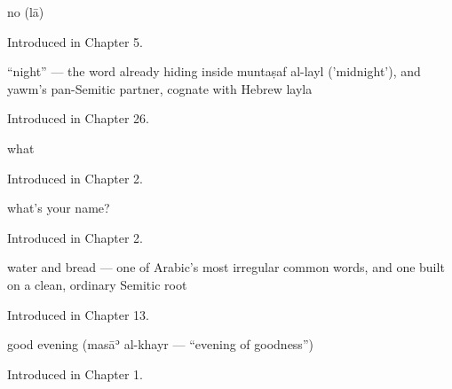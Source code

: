 \noindent\begin{minipage}[t]{\linewidth}
\raggedright
\textbf{}\par
\small no (lā)\par
\footnotesize Introduced in Chapter 5.
\end{minipage}\par\medskip

\noindent\begin{minipage}[t]{\linewidth}
\raggedright
\textbf{}\par
\small \textquotedblleft{}night\textquotedblright{} — the word already hiding inside muntaṣaf al-layl ('midnight'), and yawm's pan-Semitic partner, cognate with Hebrew layla\par
\footnotesize Introduced in Chapter 26.
\end{minipage}\par\medskip

\noindent\begin{minipage}[t]{\linewidth}
\raggedright
\textbf{}\par
\small what\par
\footnotesize Introduced in Chapter 2.
\end{minipage}\par\medskip

\noindent\begin{minipage}[t]{\linewidth}
\raggedright
\textbf{ }\par
\small what's your name?\par
\footnotesize Introduced in Chapter 2.
\end{minipage}\par\medskip

\noindent\begin{minipage}[t]{\linewidth}
\raggedright
\textbf{ }\par
\small water and bread — one of Arabic's most irregular common words, and one built on a clean, ordinary Semitic root\par
\footnotesize Introduced in Chapter 13.
\end{minipage}\par\medskip

\noindent\begin{minipage}[t]{\linewidth}
\raggedright
\textbf{ }\par
\small good evening (masāʾ al-khayr — \textquotedblleft{}evening of goodness\textquotedblright{})\par
\footnotesize Introduced in Chapter 1.
\end{minipage}\par\medskip

